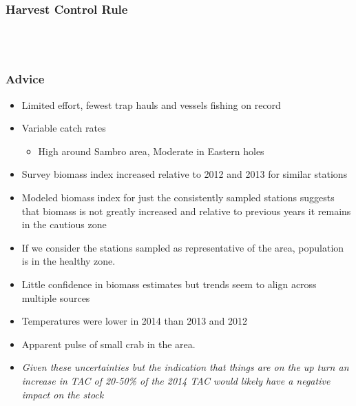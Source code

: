 \begin{frame}
\frametitle{Harvest Control Rule}
\begin{figure}

\\
   \
 

 \end{figure}
\end{frame}
%
%
\begin{frame}
\frametitle{Advice}
\begin{itemize}
\item Limited effort, fewest trap hauls and vessels fishing on record
\item Variable catch rates 
\begin{itemize}
\item High around Sambro area,  Moderate in Eastern holes
\end{itemize}
\item Survey biomass index increased relative to 2012 and 2013 for similar stations
\item Modeled biomass index for just the consistently sampled stations suggests that biomass is not greatly increased and relative to previous years it remains in the cautious zone
\item If we consider the stations sampled as representative of the area, population is in the healthy zone.
\item Little confidence in biomass estimates but trends seem to align across multiple sources
\item Temperatures were lower in 2014 than 2013 and 2012
\item Apparent pulse of small crab in the area.
\item \emph{Given these uncertainties but the indication that things are on the up turn an increase in TAC of 20-50\% of the 2014 TAC would likely have a negative impact on the stock}

\end{itemize}
\end{frame}



